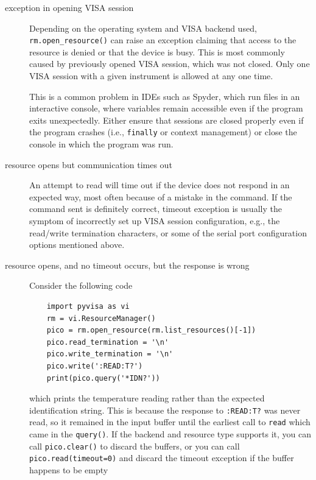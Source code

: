 \documentclass{article}
\newcommand{\ls}[1]{\lstinline{#1}}
\begin{document}
\begin{description}
    \item[exception in opening VISA session] Depending on the operating system and VISA backend used, \ls{rm.open_resource()} can raise an exception claiming that access to the resource is denied or that the device is busy. This is most commonly caused by previously opened VISA session, which was not closed. Only one VISA session with a given instrument is allowed at any one time.
    
    This is a common problem in IDEs such as Spyder, which run files in an interactive console, where variables remain accessible even if the program exits unexpectedly. Either ensure that sessions are closed properly even if the program crashes (i.e., \ls{finally} or context management) or close the console in which the program was run.

    \item[resource opens but communication times out] An attempt to read will time out if the device does not respond in an expected way, most often because of a mistake in the command. If the command sent is definitely correct, timeout exception is usually the symptom of incorrectly set up VISA session configuration, e.g., the read/write termination characters, or some of the serial port configuration options mentioned above.
    
    \item[resource opens, and no timeout occurs, but the response is wrong] Consider the following code
\begin{lstlisting}
    import pyvisa as vi
    rm = vi.ResourceManager()
    pico = rm.open_resource(rm.list_resources()[-1])    
    pico.read_termination = '\n'
    pico.write_termination = '\n'
    pico.write(':READ:T?')
    print(pico.query('*IDN?'))
\end{lstlisting}
    which prints the temperature reading rather than the expected identification string. This is because the response to \verb|:READ:T?| was never read, so it remained in the input buffer until the earliest call to \ls{read} which came in the \ls{query()}. If the backend and resource type supports it, you can call \ls{pico.clear()} to discard the buffers, or you can call \ls{pico.read(timeout=0)} and discard the timeout exception if the buffer happens to be empty
\end{description}

\newpage
\end{document}
